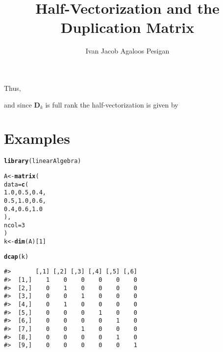 \documentclass{article}\usepackage[]{graphicx}\usepackage[]{color}
\title{Half-Vectorization and the Duplication Matrix}
\author{Ivan Jacob Agaloos Pesigan}
\date{}
\makeatletter
\newcommand{\hlnum}[1]{\textcolor[rgb]{0.686,0.059,0.569}{#1}}%
\newcommand{\hlstd}[1]{\textcolor[rgb]{0.345,0.345,0.345}{#1}}%
\newcommand{\hlkwb}[1]{\textcolor[rgb]{0.69,0.353,0.396}{#1}}%
\newcommand{\hlkwc}[1]{\textcolor[rgb]{0.333,0.667,0.333}{#1}}%
\newcommand{\hlkwd}[1]{\textcolor[rgb]{0.737,0.353,0.396}{\textbf{#1}}}%
\newenvironment{kframe}{%
 \def\at@end@of@kframe{}%
 \ifinner\ifhmode%
  \def\at@end@of@kframe{\end{minipage}}%
  \begin{minipage}{\columnwidth}%
 \fi\fi%
 \def\FrameCommand##1{\hskip\@totalleftmargin \hskip-\fboxsep
 \colorbox{shadecolor}{##1}\hskip-\fboxsep
     \hskip-\linewidth \hskip-\@totalleftmargin \hskip\columnwidth}%
 \MakeFramed {\advance\hsize-\width
   \@totalleftmargin\z@ \linewidth\hsize
   \@setminipage}}%
 {\par\unskip\endMakeFramed%
 \at@end@of@kframe}
\newenvironment{knitrout}{}{} %
\makeatother
\begin{document}
\maketitle







\noindent Thus,



\noindent and since
$
\mathbf{D}_{k}
$
is full rank the half-vectorization is given by





\newpage

\section*{Examples}

\begin{knitrout}
\color{fgcolor}\begin{kframe}
\begin{alltt}
\hlkwd{library}\hlstd{(linearAlgebra)}
\end{alltt}
\end{kframe}
\end{knitrout}


\begin{knitrout}
\color{fgcolor}\begin{kframe}
\begin{alltt}
\hlstd{A} \hlkwb{<-} \hlkwd{matrix}\hlstd{(}
  \hlkwc{data} \hlstd{=} \hlkwd{c}\hlstd{(}
    \hlnum{1.0}\hlstd{,} \hlnum{0.5}\hlstd{,} \hlnum{0.4}\hlstd{,}
    \hlnum{0.5}\hlstd{,} \hlnum{1.0}\hlstd{,} \hlnum{0.6}\hlstd{,}
    \hlnum{0.4}\hlstd{,} \hlnum{0.6}\hlstd{,} \hlnum{1.0}
  \hlstd{),}
  \hlkwc{ncol} \hlstd{=} \hlnum{3}
\hlstd{)}
\hlstd{k} \hlkwb{<-} \hlkwd{dim}\hlstd{(A)[}\hlnum{1}\hlstd{]}
\end{alltt}
\end{kframe}
\end{knitrout}

\begin{knitrout}
\color{fgcolor}\begin{kframe}
\begin{alltt}
\hlkwd{dcap}\hlstd{(k)}
\end{alltt}
\begin{verbatim}
#>       [,1] [,2] [,3] [,4] [,5] [,6]
#>  [1,]    1    0    0    0    0    0
#>  [2,]    0    1    0    0    0    0
#>  [3,]    0    0    1    0    0    0
#>  [4,]    0    1    0    0    0    0
#>  [5,]    0    0    0    1    0    0
#>  [6,]    0    0    0    0    1    0
#>  [7,]    0    0    1    0    0    0
#>  [8,]    0    0    0    0    1    0
#>  [9,]    0    0    0    0    0    1
\end{verbatim}
\end{kframe}
\end{knitrout}
\end{document}
